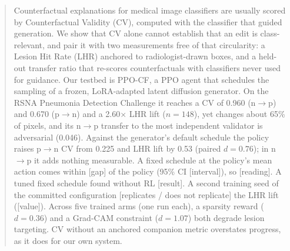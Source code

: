 \begin{abstract}
Counterfactual explanations for medical image classifiers are usually scored by Counterfactual Validity (CV), computed with the classifier that guided generation. We show that CV alone cannot establish that an edit is class-relevant, and pair it with two measurements free of that circularity: a Lesion Hit Rate (LHR) anchored to radiologist-drawn boxes, and a held-out transfer ratio that re-scores counterfactuals with classifiers never used for guidance. Our testbed is PPO-CF, a PPO agent that schedules the sampling of a frozen, LoRA-adapted latent diffusion generator. On the RSNA Pneumonia Detection Challenge it reaches a CV of 0.960 (n$\to$p) and 0.670 (p$\to$n) and a 2.60$\times$ LHR lift ($n = 148$), yet changes about 65\% of pixels, and its n$\to$p transfer to the most independent validator is adversarial (0.046). Against the generator's default schedule the policy raises p$\to$n CV from 0.225 and LHR lift by 0.53 (paired $d = 0.76$); in n$\to$p it adds nothing measurable.
A fixed schedule at the policy's mean action comes within [gap] of the policy (95\% CI [interval]), so [reading]. %
A tuned fixed schedule found without RL [result]. %
A second training seed of the committed configuration [replicates / does not replicate] the LHR lift ([value]). %
Across five trained arms (one run each), a sparsity reward ($d = 0.36$) and a Grad-CAM constraint ($d = 1.07$) both degrade lesion targeting. CV without an anchored companion metric overstates progress, as it does for our own system.
\end{abstract}
